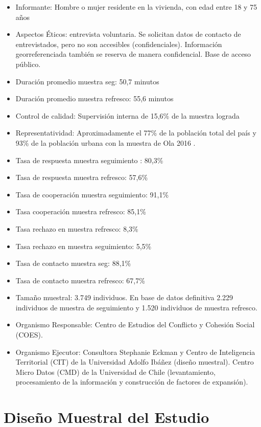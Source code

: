 \documentclass[
  openany]{book}
\begin{document}
\begin{itemize}
\item
  Informante: Hombre o mujer residente en la vivienda, con edad entre 18 y 75 años
\item
  Aspectos Éticos: entrevista voluntaria. Se solicitan datos de contacto de entrevistados, pero no son accesibles (confidenciales). Información georreferenciada también se reserva de manera confidencial. Base de acceso público.
\item
  Duración promedio muestra seg: 50,7 minutos
\item
  Duración promedio muestra refresco: 55,6 minutos
\item
  Control de calidad: Supervisión interna de 15,6\% de la muestra lograda
\item
  Representatividad: Aproximadamente el 77\% de la población total del país y 93\% de la población urbana con la muestra de Ola 2016 .
\item
  Tasa de respuesta muestra seguimiento : 80,3\%
\item
  Tasa de respuesta muestra refresco: 57,6\%
\item
  Tasa de cooperación muestra seguimiento: 91,1\%
\item
  Tasa cooperación muestra refresco: 85,1\%
\item
  Tasa rechazo en muestra refresco: 8,3\%
\item
  Tasa rechazo en muestra seguimiento: 5,5\%
\item
  Tasa de contacto muestra seg: 88,1\%
\item
  Tasa de contacto muestra refresco: 67,7\%
\item
  Tamaño muestral: 3.749 individuos. En base de datos definitiva 2.229 individuos de muestra de seguimiento y 1.520 individuos de muestra refresco.
\item
  Organismo Responsable: Centro de Estudios del Conflicto y Cohesión Social (COES).
\item
  Organismo Ejecutor: Consultora Stephanie Eckman y Centro de Inteligencia Territorial (CIT) de la Universidad Adolfo Ibáñez (diseño muestral). Centro Micro Datos (CMD) de la Universidad de Chile (levantamiento, procesamiento de la información y construcción de factores de expansión).
\end{itemize}

\hypertarget{dis_muestral}{%
\chapter{Diseño Muestral del Estudio}\label{dis_muestral}}
\end{document}
